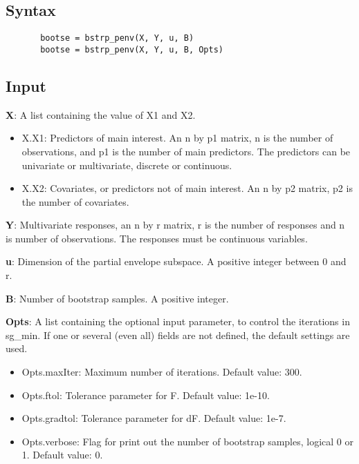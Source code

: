 \documentclass[a4paper,11pt,openany]{memoir}
\begin{document}
\subsection*{Syntax}


\begin{verbatim}       bootse = bstrp_penv(X, Y, u, B)
       bootse = bstrp_penv(X, Y, u, B, Opts)\end{verbatim}
    

\subsection*{Input}

\begin{par}
\textbf{X}: A list containing the value of X1 and X2.
\end{par} \vspace{1em}
\begin{itemize}
\setlength{\itemsep}{-1ex}
   \item X.X1: Predictors of main interest. An n by p1 matrix, n is the number of observations, and p1 is the number of main predictors. The predictors can be univariate or multivariate, discrete or continuous.
   \item X.X2: Covariates, or predictors not of main interest.  An n by p2 matrix, p2 is the number of covariates.
\end{itemize}
\begin{par}
\textbf{Y}: Multivariate responses, an n by r matrix, r is the number of responses and n is number of observations.  The responses must be continuous variables.
\end{par} \vspace{1em}
\begin{par}
\textbf{u}: Dimension of the partial envelope subspace.  A positive integer between 0 and r.
\end{par} \vspace{1em}
\begin{par}
\textbf{B}: Number of bootstrap samples.  A positive integer.
\end{par} \vspace{1em}
\begin{par}
\textbf{Opts}: A list containing the optional input parameter, to control the iterations in sg\_min. If one or several (even all) fields are not defined, the default settings are used.
\end{par} \vspace{1em}
\begin{itemize}
\setlength{\itemsep}{-1ex}
   \item Opts.maxIter: Maximum number of iterations.  Default value: 300.
   \item Opts.ftol: Tolerance parameter for F.  Default value: 1e-10.
   \item Opts.gradtol: Tolerance parameter for dF.  Default value: 1e-7.
   \item Opts.verbose: Flag for print out the number of bootstrap samples, logical 0 or 1. Default value: 0.
\end{itemize}
\end{document}
